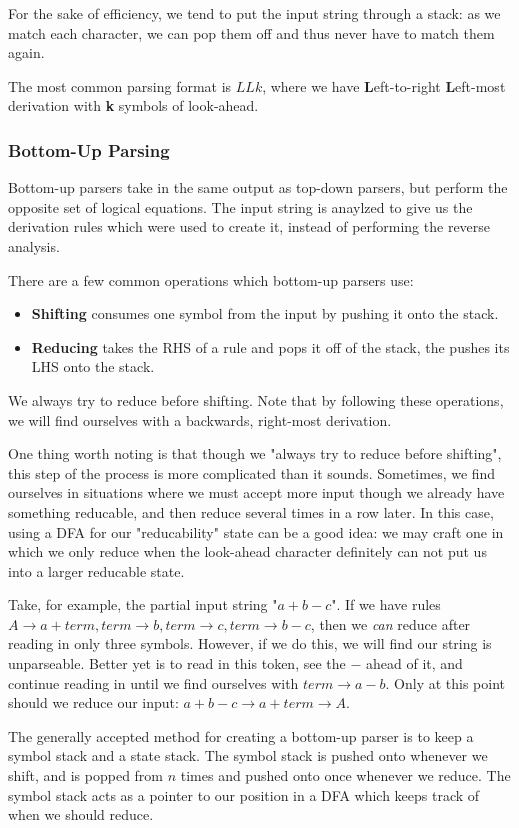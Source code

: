 \documentclass[12pt]{article}
\begin{document}
For the sake of efficiency, we tend to put the input string through a stack: as we match each character, we can pop them off and thus never have to match them again.

The most common parsing format is $LLk$, where we have {\bf L}eft-to-right {\bf L}eft-most derivation with {\bf k} symbols of look-ahead.

\subsubsection*{Bottom-Up Parsing}
Bottom-up parsers take in the same output as top-down parsers, but perform the opposite set of logical equations. The input string is anaylzed to give us the derivation rules which were used to create it, instead of performing the reverse analysis.

There are a few common operations which bottom-up parsers use:
\begin{itemize}
\item {\bf Shifting} consumes one symbol from the input by pushing it onto the stack.
\item {\bf Reducing} takes the RHS of a rule and pops it off of the stack, the pushes its LHS onto the stack.
\end{itemize}

We always try to reduce before shifting. Note that by following these operations, we will find ourselves with a backwards, right-most derivation.

One thing worth noting is that though we "always try to reduce before shifting", this step of the process is more complicated than it sounds. Sometimes, we find ourselves in situations where we must accept more input though we already have something reducable, and then reduce several times in a row later. In this case, using a DFA for our "reducability" state can be a good idea: we may craft one in which we only reduce when the look-ahead character definitely can not put us into a larger reducable state.

Take, for example, the partial input string "$a+b-c$". If we have rules $A \to a+term, term \to b, term \to c, term \to b-c$, then we {\it can} reduce after reading in only three symbols. However, if we do this, we will find our string is unparseable. Better yet is to read in this token, see the $-$ ahead of it, and continue reading in until we find ourselves with $term \to a-b$. Only at this point should we reduce our input: $a+b-c \to a+term \to A$.

The generally accepted method for creating a bottom-up parser is to keep a symbol stack and a state stack. The symbol stack is pushed onto whenever we shift, and is popped from $n$ times and pushed onto once whenever we reduce. The symbol stack acts as a pointer to our position in a DFA which keeps track of when we should reduce.
\end{document}
